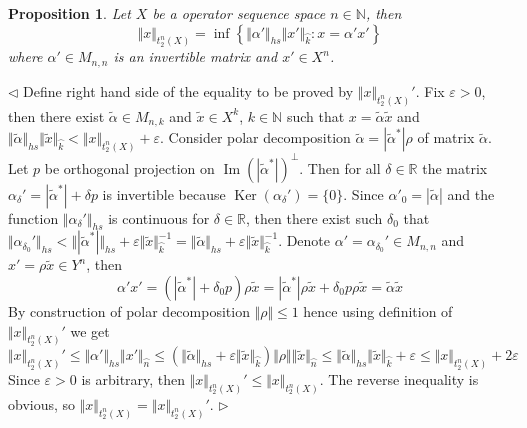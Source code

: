 \documentclass[12pt]{article}
\newtheorem{proposition}[theorem]{Proposition}
\newenvironment{proof}{\par $\triangleleft$}{$\triangleright$}
\begin{document}
\begin{proposition}\label{PrT2nNormProperty}
Let $X$ be a operator sequence space $n\in\mathbb{N}$, then
$$
\Vert x\Vert_{t_2^n(X)}=\inf\left \{\Vert\alpha'\Vert_{hs}\Vert
x'\Vert_{\wideparen{k}}:x=\alpha'x'\right \}
$$
where $\alpha'\in M_{n,n}$ is an invertible matrix and $x'\in X^{n}$.
\end{proposition}
\begin{proof}
Define right hand side of the equality to be proved by 
$\Vert x\Vert_{t_2^n(X)}'$. Fix $\varepsilon>0$, then there exist 
$\tilde{\alpha}\in M_{n,k}$ and $\tilde{x}\in X^{k}$, $k\in\mathbb{N}$ such that 
$x=\tilde{\alpha}\tilde{x}$ and 
$\Vert\tilde{\alpha}\Vert_{hs}\Vert\tilde{x}\Vert_{\wideparen{k}}
<\Vert x\Vert_{t_2^n(X)}+\varepsilon$. Consider polar decomposition 
$\tilde{\alpha}=|\tilde{\alpha}^*| \rho$ of matrix $\tilde{\alpha}$. 
Let $p$ be orthogonal projection on 
$\operatorname{Im}{(|\tilde{\alpha}^*|)}^\perp$. Then for all 
$\delta\in\mathbb{R}$ the matrix 
$\alpha_\delta'=|\tilde{\alpha}^*|+\delta p$ is invertible because 
$\operatorname{Ker}(\alpha_\delta')= \{0 \}$. Since 
$\alpha'_0=|\tilde{\alpha}|$ and the function $\Vert\alpha_\delta'\Vert_{hs}$ is 
continuous for $\delta\in\mathbb{R}$, then there exist such $\delta_0$ that 
$\Vert\alpha_{\delta_0}'\Vert_{hs}
<\Vert|\tilde{\alpha}^*|\Vert_{hs}
+\varepsilon\Vert \tilde{x}\Vert_{\wideparen{k}}^{-1}
=\Vert\tilde{\alpha}\Vert_{hs}
+\varepsilon\Vert \tilde{x}\Vert_{\wideparen{k}}^{-1}$. 
Denote $\alpha'=\alpha_{\delta_0}'\in M_{n,n}$ and $x'=\rho\tilde{x}\in Y^n$, 
then 
$$
\alpha'x' =(|\tilde{\alpha}^*|+\delta_0 p)\rho \tilde{x} 
=|\tilde{\alpha}^*|\rho \tilde{x}
+\delta_0 p\rho \tilde{x} 
=\tilde{\alpha}\tilde{x}
$$
By construction of polar decomposition $\Vert \rho\Vert\leq 1$ hence using 
definition of $\Vert x\Vert_{t_2^n(X)}'$ we get
$$
\Vert x\Vert_{t_2^n(X)}'
\leq \Vert\alpha'\Vert_{hs}\Vert x'\Vert_{\wideparen{n}}
\leq (\Vert\tilde{\alpha}\Vert_{hs}+\varepsilon\Vert
\tilde{x}\Vert_{\wideparen{k}})\Vert
\rho\Vert\Vert\tilde{x}\Vert_{\wideparen{n}}
\leq\Vert\tilde{\alpha}\Vert_{hs}\Vert\tilde{x}\Vert_{\wideparen{k}}+\varepsilon
\leq \Vert x\Vert_{t_2^n(X)}+2\varepsilon
$$
Since $\varepsilon>0$ is arbitrary, then 
$\Vert x\Vert_{t_2^n(X)}'\leq\Vert x\Vert_{t_2^n(X)}$. The reverse inequality 
is obvious, so $\Vert x\Vert_{t_2^n(X)}=\Vert x\Vert_{t_2^n(X)}'$.
\end{proof}
\end{document}
